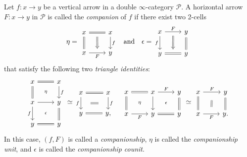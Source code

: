 \documentclass[a4paper, 11pt]{amsart}
\numberwithin{theorem}{section}
\theoremstyle{definition}
\renewcommand{\P}{\mathscr{P}}
\begin{document}
\begin{definition}\label{def.compconj}
	Let $f : x \rightarrow y$ be a vertical arrow in a double $\infty$-category $\P$. A horizontal arrow 
	$F : x \rightarrow y$ in $\P$ is called the \textit{companion} of $f$  
	if there exist two 2-cells
	\[
		\eta = \begin{tikzcd}
			x\arrow[d, equal] \arrow[r, equal, ""name=f] & x\arrow[d, "f"] \\
			x \arrow[r, "F"'name=t] & y
			\arrow[from=f,to=t,Rightarrow, shorten <= 6pt, shorten >= 6pt]
		\end{tikzcd} 
		\quad 
		\text{and}
		\quad
		\epsilon = \begin{tikzcd}
			x \arrow[r, "F"name=f]\arrow[d, "f"' ] & y \arrow[d, equal] \\
			y \arrow[r, equal, ""'name=t] & y
			\arrow[from=f,to=t,Rightarrow, shorten <= 6pt, shorten >= 6pt]
		\end{tikzcd}
	\] 
	that satisfy the following two \textit{triangle identities}:
	\[
		\begin{tikzcd}
			x\arrow[d, equal] \arrow[r, equal, ""'name=h1] & x\arrow[d, "f"] \\
			x \arrow[r, ""name=h2]\arrow[d, "f"'] & y \arrow[d, equal] \\
			y \arrow[r, equal, ""'name=h3] & y
			\arrow[from=h1, to=h2, phantom, "\scriptstyle\eta"]
			\arrow[from=h2, to=h3, phantom, "\scriptstyle\epsilon"]
		\end{tikzcd}
		\simeq
		\begin{tikzcd}
			x\arrow[r,equal] \arrow[d, "f"'name=t1] & x \arrow[d, "f"name=f1] \\
			y \arrow[r, equal]  & y,
			\arrow[from=f1, to=t1, equal, shorten <= 14pt, shorten >= 14pt]
		\end{tikzcd}
		\quad 
		\begin{tikzcd}
			x \arrow[r, equal, ""name=h1]\arrow[d, equal] & x \arrow[d] \arrow[r, "F"name=h3] & y\arrow[d, equal] \\
			x \arrow[r, "F"'name=h2] & y \arrow[r, equal, ""'name=h4] & y
			\arrow[from=h1, to=h2, phantom, "\scriptstyle\eta"]
			\arrow[from=h3, to=h4, phantom, "\scriptstyle\epsilon"]
		\end{tikzcd}
		\simeq
		\begin{tikzcd}
			x\arrow[d,equal] \arrow[r, "F"name=f1] & y \arrow[d,equal] \\
			x \arrow[r, "F"'name=t1] & y.
			\arrow[from=f1, to=t1, equal, shorten <= 12pt, shorten >= 10pt]
		\end{tikzcd}
	\]
	In this case, $(f,F)$ is called a \textit{companionship}, $\eta$ is called the \textit{companionship unit}, and $\epsilon$ is called the 
	\textit{companionship counit}.
	

\end{definition}
\end{document}
